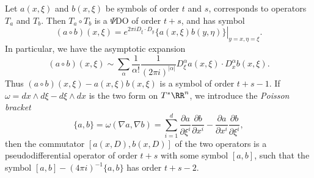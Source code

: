 \begin{theorem}
    Let $a(x,\xi)$ and $b(x,\xi)$ be symbols of order $t$ and $s$, corresponds to operators $T_a$ and $T_b$. Then $T_a \circ T_b$ is a $\Psi$DO of order $t + s$, and has symbol
    \[ (a \circ b)(x, \xi) = \left. e^{2 \pi i D_\xi \cdot D_y} \{ a(x,\xi) b(y,\eta) \} \right|_{y = x, \eta = \xi}. \]
    In particular, we have the asymptotic expansion
    \[ (a \circ b)(x,\xi) \sim \sum_\alpha \frac{1}{\alpha!} \frac{1}{(2 \pi i)^{|\alpha|}} D^\alpha_\xi a(x,\xi) \cdot D^\alpha_x b(x,\xi). \]
    Thus $(a \circ b)(x,\xi) - a(x,\xi) b(x,\xi)$ is a symbol of order $t + s - 1$. If $\omega = dx \wedge d \xi - d\xi \wedge dx$ is the two form on $T^* \RR^n$, we introduce the \emph{Poisson bracket}
    \[ \{ a, b \} = \omega ( \nabla a, \nabla b ) = \sum_{i = 1}^d \frac{\partial a}{\partial \xi^i} \frac{\partial b}{\partial x^i} - \frac{\partial a}{\partial x^i} \frac{\partial b}{\partial \xi^i}, \]
    then the commutator $[a(x,D), b(x,D)]$ of the two operators is a pseudodifferential operator of order $t + s$ with some symbol $[a,b]$, such that the symbol $[a,b] - (4 \pi i)^{-1} \{ a, b \}$ has order $t + s - 2$.
\end{theorem}
